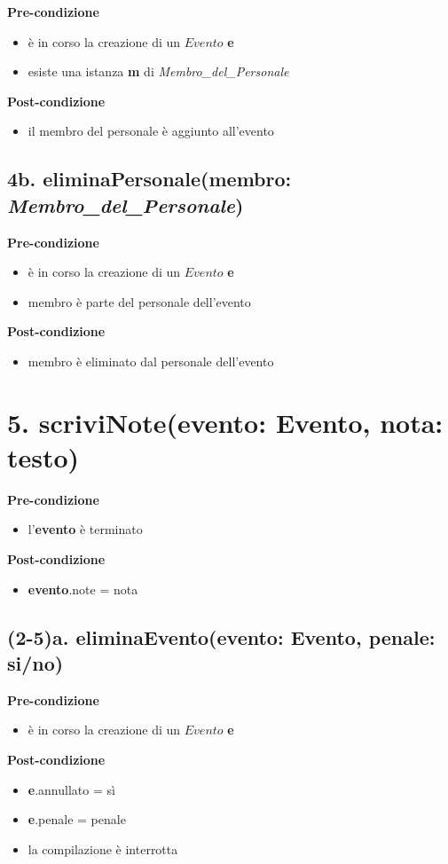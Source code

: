 \documentclass[14pt]{extarticle}
\begin{document}
\textbf{Pre-condizione}
\begin{itemize}
  \item è in corso la creazione di un $Evento$ \textbf{e}
  \item esiste una istanza \textbf{m} di \textit{Membro\_del\_Personale}
\end{itemize}
\textbf{Post-condizione}
\begin{itemize}
  \item il membro del personale è aggiunto all'evento
\end{itemize}


\subsection*{4b. eliminaPersonale(membro: \textit{Membro\_del\_Personale})}

\textbf{Pre-condizione}
\begin{itemize}
  \item è in corso la creazione di un $Evento$ \textbf{e}
  \item membro è parte del personale dell'evento
\end{itemize}
\textbf{Post-condizione}
\begin{itemize}
  \item membro è eliminato dal personale dell'evento
\end{itemize}


\section*{5. scriviNote(evento: Evento, nota: testo)}

\textbf{Pre-condizione}
\begin{itemize}
  \item l'\textbf{evento} è terminato
\end{itemize}
\textbf{Post-condizione}
\begin{itemize}
  \item \textbf{evento}.note = nota
\end{itemize}


\subsection*{(2-5)a. eliminaEvento(evento: Evento, penale: si/no)}

\textbf{Pre-condizione}
\begin{itemize}
  \item è in corso la creazione di un $Evento$ \textbf{e}
\end{itemize}
\textbf{Post-condizione}
\begin{itemize}
  \item \textbf{e}.annullato = sì
  \item \textbf{e}.penale = penale
  \item la compilazione è interrotta
\end{itemize}  
\end{document}
